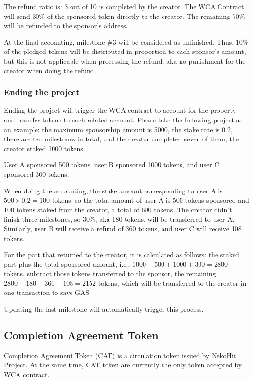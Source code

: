 The refund ratio is: 3 out of 10 is completed by the creator.
The WCA Contract will send 30\% of the sponsored token directly to the creator.
The remaining 70\% will be refunded to the sponsor's address.

At the final accounting, milestone \#3 will be considered as unfinished.
Thus, 10\% of the pledged tokens will be distributed in proportion to
each sponsor's amount, but this is not applicable when processing the refund,
aka no punishment for the creator when doing the refund.

\subsubsection{Ending the project}

Ending the project will trigger the WCA contract to account for the property
and transfer tokens to each related account.
Please take the following project as an example: the maximum sponsorship amount
is 5000, the stake rate is 0.2, there are ten milestones in total, and the
creator completed seven of them, the creator staked 1000 tokens.

User A sponsored 500 tokens, user B sponsored 1000 tokens, and user C sponsored
300 tokens.

When doing the accounting, the stake amount corresponding to user A is
$500 \times 0.2 = 100$ tokens, so the total amount of user A is 500 tokens
sponsored and 100 tokens staked from the creator, a total of 600 tokens.
The creator didn't finish three milestones, so 30\%, aka 180 tokens, will be
transferred to user A\@.
Similarly, user B will receive a refund of 360 tokens, and user C will receive
108 tokens.

For the part that returned to the creator, it is calculated as follows: the
staked part plus the total sponsored amount, i.e.,
$1000 + 500 + 1000 + 300 = 2800$ tokens, subtract those tokens transferred
to the sponsor, the remaining $2800 - 180 - 360 - 108 = 2152$ tokens, which
will be transferred to the creator in one transaction to save GAS\@.

Updating the last milestone will automatically trigger this process.

\subsection{Completion Agreement Token}\label{subsec:cat}

Completion Agreement Token (CAT) is a circulation token issued by NekoHit Project.
At the same time, CAT token are currently the only token accepted by WCA contract.

